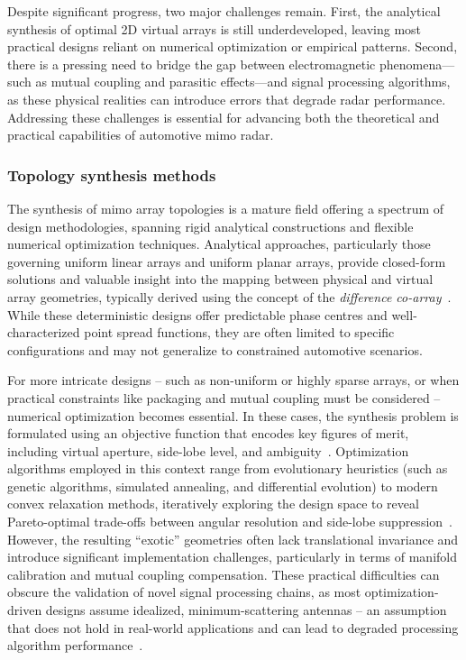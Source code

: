Despite significant progress, two major challenges remain.
First, the analytical synthesis of optimal 2D virtual arrays is still underdeveloped, leaving most practical designs reliant on numerical optimization or empirical patterns.
Second, there is a pressing need to bridge the gap between electromagnetic phenomena—such as mutual coupling and parasitic effects—and signal processing algorithms, as these physical realities can introduce errors that degrade radar performance.
Addressing these challenges is essential for advancing both the theoretical and practical capabilities of automotive \gls{mimo} radar.


\subsubsection{Topology synthesis methods}

The synthesis of \gls{mimo} array topologies is a mature field offering a spectrum of design methodologies, spanning rigid analytical constructions and flexible numerical optimization techniques.
Analytical approaches, particularly those governing uniform linear arrays and uniform planar arrays, provide closed-form solutions and valuable insight into the mapping between physical and virtual array geometries, typically derived using the concept of the \emph{difference co-array}~\parencite{aminSparseArraysRadar2024}.
While these deterministic designs offer predictable phase centres and well-characterized point spread functions, they are often limited to specific configurations and may not generalize to constrained automotive scenarios.

For more intricate designs -- such as non-uniform or highly sparse arrays, or when practical constraints like packaging and mutual coupling must be considered -- numerical optimization becomes essential.
In these cases, the synthesis problem is formulated using an objective function that encodes key figures of merit, including virtual aperture, side-lobe level, and ambiguity~\parencite{ericAmbiguityCharacterizationArbitrary1998}.
Optimization algorithms employed in this context range from evolutionary heuristics (such as genetic algorithms, simulated annealing, and differential evolution) to modern convex relaxation methods, iteratively exploring the design space to reveal Pareto-optimal trade-offs between angular resolution and side-lobe suppression~\parencite{huanSASASuperResolutionAmbiguityFree2023}.
However, the resulting \enquote{exotic} geometries often lack translational invariance and introduce significant implementation challenges, particularly in terms of manifold calibration and mutual coupling compensation.
These practical difficulties can obscure the validation of novel signal processing chains, as most optimization-driven designs assume idealized, minimum-scattering antennas -- an assumption that does not hold in real-world applications and can lead to degraded processing algorithm performance~\parencite{arnoldEffectAntennaMutual2019}.

